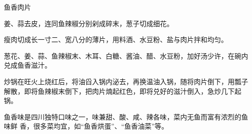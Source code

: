\begin{recipe}{鱼香肉片}

\ingredients


\preparation

\step 姜、蒜去皮，连同鱼辣椒分别剁成碎末，葱子切成细花。

\step 瘦肉切成长一寸二、宽八分的薄片，用料酒、水豆粉、盐与肉片拌和均匀。

\step 葱花、姜、蒜、鱼辣椒末、木耳、白糖、酱油、醋、水豆粉，加好汤少许，在碗内
兑成鱼香滋汁。

\step 炒锅在旺火上烧红后，将油舀入锅内泌去，再换温油入锅，随将肉片倒下，用瓢子
解散，即将鱼辣椒末倒下，把肉片煵起红色，即将兑好的滋汁倒入，急炒几下起锅。

\features

鱼香味是四川独特口味之一，味兼甜、酸、咸、辣各味，菜内无鱼而富有浓烈的鱼味鲜
香，很多菜均宜，如“鱼香烘蛋”、“鱼香油菜”等。

\end{recipe}

